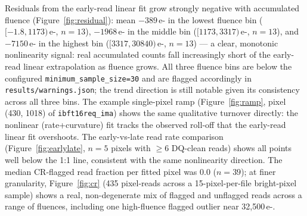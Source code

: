 \documentclass[11pt]{article}
\begin{document}
Residuals from the early-read linear fit grow strongly negative with
accumulated fluence (Figure~\ref{fig:residual}): mean $-389$\,e- in the
lowest fluence bin ($[-1.8, 1173)$\,e-, $n=13$), $-1968$\,e- in the middle
bin ($[1173, 3317)$\,e-, $n=13$), and $-7150$\,e- in the highest bin
($[3317, 30840)$\,e-, $n=13$) --- a clear, monotonic nonlinearity signal:
real accumulated counts fall increasingly short of the early-read linear
extrapolation as fluence grows. All three fluence bins are below the
configured \texttt{minimum\_sample\_size=30} and are flagged accordingly in
\texttt{results/warnings.json}; the trend direction is still notable given
its consistency across all three bins. The example single-pixel ramp
(Figure~\ref{fig:ramp}, pixel (430, 1018) of \texttt{ibft16req\_ima}) shows
the same qualitative turnover directly: the nonlinear (rate+curvature) fit
tracks the observed roll-off that the early-read linear fit overshoots.
The early-vs-late read rate comparison (Figure~\ref{fig:earlylate}, $n=5$
pixels with $\geq 6$ DQ-clean reads) shows all points well below the 1:1
line, consistent with the same nonlinearity direction. The median CR-flagged
read fraction per fitted pixel was 0.0 ($n=39$); at finer granularity,
Figure~\ref{fig:cr} (435 pixel-reads across a 15-pixel-per-file bright-pixel
sample) shows a real, non-degenerate mix of flagged and unflagged reads
across a range of fluences, including one high-fluence flagged outlier
near 32{,}500\,e-.
\end{document}
